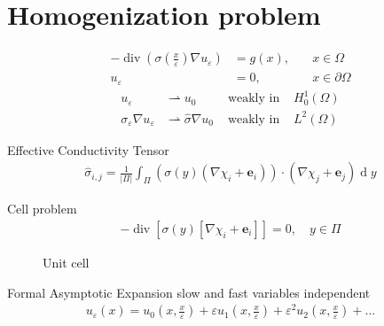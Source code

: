 \documentclass[nosymbols]{beamer}	%
\begin{document}
\section{Homogenization problem}
\begin{frame}
\begin{align*}
-\operatorname{div} (\sigma(\frac{x}{\varepsilon}) \nabla u_{\varepsilon}) &= g(x) , \quad & x \in \Omega\\
u_{\varepsilon} &= 0, \quad &x \in \partial \Omega
\end{align*}
\begin{align*}
u_{\varepsilon} &\rightharpoonup u_0 &\text{ weakly in } &H^1_0(\Omega)\\
\sigma_{\varepsilon}\nabla u_{\varepsilon} &\rightharpoonup \hat \sigma \nabla u_0 &\text{ weakly in } &L^2(\Omega)
\end{align*}
\end{frame}

\begin{frame}{Effective Conductivity Tensor}
\begin{align*}
\hat \sigma_{i,j} = \frac{1}{|\Pi|} \int_{\Pi} (\sigma(y)(\nabla \chi_i + \boldsymbol e_i)) \cdot (\nabla \chi_j + \boldsymbol e_j) \operatorname d y
\end{align*}
\end{frame}

\begin{frame}{Cell problem}
\begin{align}
- \operatorname{div} \left[ \sigma(y)[\nabla \chi_i + \boldsymbol e_i ]\right] = 0 , \quad y \in \Pi
\end{align}
\begin{figure}
\caption{Unit cell}
\end{figure}
\end{frame}
%
\begin{frame}{Formal Asymptotic Expansion}
slow and fast variables independent
\begin{align}
u_{\varepsilon} (x) = u_0(x,\frac{x}{\varepsilon}) + \varepsilon u_1(x,\frac{x}{\varepsilon}) + \varepsilon^2 u_2(x,\frac{x}{\varepsilon}) + ...
\end{align}
\end{frame}
%
\end{document}
